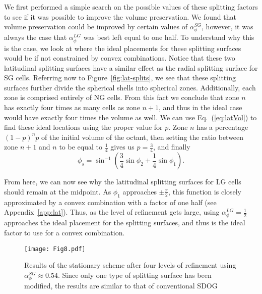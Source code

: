 We first performed a simple search on the possible values of these splitting factors to see if it was possible to improve the volume preservation.
We found that volume preservation could be improved by certain values of $\alpha_{\phi}^{SG}$, however, it was always the case that $\alpha_{\phi}^{LG}$ was best left equal to one half.
To understand why this is the case, we look at where the ideal placements for these splitting surfaces would be if not constrained by convex combinations.
Notice that these two latitudinal splitting surfaces have a similar effect as the radial splitting surface for SG cells.
Referring now to Figure~\ref{fig:lat-splits}, we see that these splitting surfaces further divide the spherical shells into spherical zones.
Additionally, each zone is comprised entirely of NG cells.
From this fact we conclude that zone $n$ has exactly four times as many cells as zone $n+1$, and thus in the ideal case would have exactly four times the volume as well.
We can use Eq.~(\ref{eq:latVol}) to find these ideal locations using the proper value for $p$.
Zone $n$ has a percentage $\left( 1 - p \right)^{n} p$ of the initial volume of the octant, then setting the ratio between zone $n+1$ and $n$ to be equal to $\frac{1}{4}$ gives us $p = \frac{3}{4}$, and finally
%
\begin{equation} \label{eq:idealLat}
\phi_{s} = \sin^{-1} \left( \frac{3}{4} \sin\phi_{2} + \frac{1}{4} \sin\phi_{1} \right).
\end{equation}


From here, we can now see why the latitudinal splitting surfaces for LG cells should remain at the midpoint.
As $\phi_{1}$ approaches $\pm \frac{\pi}{2}$, this function is closely approximated by a convex combination with a factor of one half (see Appendix~\ref{app:lat}).
Thus, as the level of refinement gets large, using $\alpha_{\phi}^{LG} = \frac{1}{2}$ approaches the ideal placement for the splitting surfaces, and thus is the ideal factor to use for a convex combination.


\begin{figure}[tb]
	\texttt{[image: Fig8.pdf]}
	\caption[Title]{
		Results of the stationary scheme after four levels of refinement using $\alpha_{\phi}^{SG} \approx 0.54$.
		Since only one type of splitting surface has been modified, the results are similar to that of conventional SDOG
	}
	\label{fig:stationary}
\end{figure}


